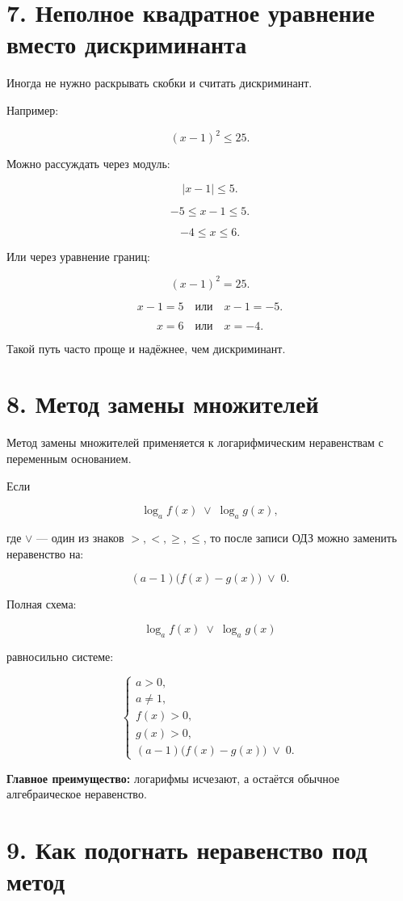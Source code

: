 \documentclass[a4paper,12pt]{article}
\begin{document}
\section*{7. Неполное квадратное уравнение вместо дискриминанта}

Иногда не нужно раскрывать скобки и считать дискриминант.

Например:

\[
(x-1)^2\le25.
\]

Можно рассуждать через модуль:

\[
|x-1|\le5.
\]

\[
-5\le x-1\le5.
\]

\[
-4\le x\le6.
\]

Или через уравнение границ:

\[
(x-1)^2=25.
\]

\[
x-1=5
\quad\text{или}\quad
x-1=-5.
\]

\[
x=6
\quad\text{или}\quad
x=-4.
\]

Такой путь часто проще и надёжнее, чем дискриминант.

\section*{8. Метод замены множителей}

Метод замены множителей применяется к логарифмическим неравенствам с переменным основанием.

Если

\[
\log_a f(x)\;\vee\;\log_a g(x),
\]

где \(\vee\) — один из знаков \(>,<,\ge,\le\), то после записи ОДЗ можно заменить неравенство на:

\[
(a-1)\bigl(f(x)-g(x)\bigr)\;\vee\;0.
\]

Полная схема:

\[
\log_a f(x)\;\vee\;\log_a g(x)
\]

равносильно системе:

\[
\begin{cases}
a>0,\\
a\ne1,\\
f(x)>0,\\
g(x)>0,\\
(a-1)\bigl(f(x)-g(x)\bigr)\;\vee\;0.
\end{cases}
\]

\textbf{Главное преимущество:} логарифмы исчезают, а остаётся обычное алгебраическое неравенство.

\section*{9. Как подогнать неравенство под метод}
\end{document}
